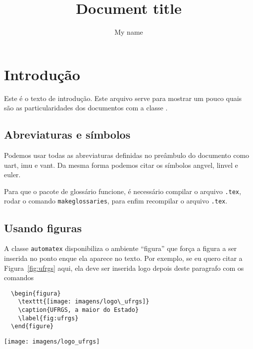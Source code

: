 \documentclass[portugues]{automatex}
\title{Document title}
\author{My name}
\begin{document}
\maketitle %

\section{Introdução}

Este é o texto de introdução. Este arquivo serve para mostrar um pouco quais são as particularidades dos documentos com a classe \automatex.

\subsection{Abreviaturas e símbolos}

Podemos usar todas as abreviaturas definidas no preâmbulo do documento como \gls{uart}, \gls{imu} e \gls{vant}. Da mesma forma podemos citar os símbolos \gls{angvel}, \gls{linvel} e \gls{euler}.

Para que o pacote de glossário funcione, é necessário compilar o arquivo \verb+.tex+, rodar o comando \verb+makeglossaries+, para enfim recompilar o arquivo \verb+.tex+.

\subsection{Usando figuras}

A classe \verb+automatex+ disponibiliza o ambiente ``figura'' que força a figura a ser inserida no ponto enque ela aparece no texto. Por exemplo, se eu quero citar a Figura~\ref{fig:ufrgs} aqui, ela deve ser inserida logo depois deste paragrafo com os comandos
\begin{verbatim}
  \begin{figura}
    \texttt{[image: imagens/logo\_ufrgs]}
    \caption{UFRGS, a maior do Estado}
    \label{fig:ufrgs}
  \end{figure}
\end{verbatim}

\begin{figura}
  \texttt{[image: imagens/logo\_ufrgs]}
  \caption{UFRGS, a maior do Estado}
  \label{fig:ufrgs}
\end{figura}
\end{document}
